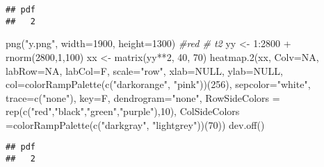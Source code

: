 \documentclass[
]{article}
\newenvironment{Shaded}{\begin{snugshade}}{\end{snugshade}}
\newcommand{\AttributeTok}[1]{\textcolor[rgb]{0.77,0.63,0.00}{#1}}
\newcommand{\CommentTok}[1]{\textcolor[rgb]{0.56,0.35,0.01}{\textit{#1}}}
\newcommand{\ConstantTok}[1]{\textcolor[rgb]{0.00,0.00,0.00}{#1}}
\newcommand{\DecValTok}[1]{\textcolor[rgb]{0.00,0.00,0.81}{#1}}
\newcommand{\FunctionTok}[1]{\textcolor[rgb]{0.00,0.00,0.00}{#1}}
\newcommand{\NormalTok}[1]{#1}
\newcommand{\OtherTok}[1]{\textcolor[rgb]{0.56,0.35,0.01}{#1}}
\newcommand{\SpecialCharTok}[1]{\textcolor[rgb]{0.00,0.00,0.00}{#1}}
\newcommand{\StringTok}[1]{\textcolor[rgb]{0.31,0.60,0.02}{#1}}
\begin{document}
\begin{verbatim}
## pdf 
##   2
\end{verbatim}

\begin{Shaded}
\begin{Highlighting}[]
\FunctionTok{png}\NormalTok{(}\StringTok{"y.png"}\NormalTok{, }\AttributeTok{width=}\DecValTok{1900}\NormalTok{, }\AttributeTok{height=}\DecValTok{1300}\NormalTok{) }\CommentTok{\#red \# t2 }
\NormalTok{yy }\OtherTok{\textless{}{-}} \DecValTok{1}\SpecialCharTok{:}\DecValTok{2800} \SpecialCharTok{+} \FunctionTok{rnorm}\NormalTok{(}\DecValTok{2800}\NormalTok{,}\DecValTok{1}\NormalTok{,}\DecValTok{100}\NormalTok{)}
\NormalTok{xx }\OtherTok{\textless{}{-}} \FunctionTok{matrix}\NormalTok{(yy}\SpecialCharTok{**}\DecValTok{2}\NormalTok{, }\DecValTok{40}\NormalTok{, }\DecValTok{70}\NormalTok{)}
\FunctionTok{heatmap.2}\NormalTok{(xx, }\AttributeTok{Colv=}\ConstantTok{NA}\NormalTok{, }\AttributeTok{labRow=}\ConstantTok{NA}\NormalTok{, }\AttributeTok{labCol=}\NormalTok{F, }\AttributeTok{scale=}\StringTok{"row"}\NormalTok{, }\AttributeTok{xlab=}\ConstantTok{NULL}\NormalTok{,}
          \AttributeTok{ylab=}\ConstantTok{NULL}\NormalTok{, }\AttributeTok{col=}\FunctionTok{colorRampPalette}\NormalTok{(}\FunctionTok{c}\NormalTok{(}\StringTok{"darkorange"}\NormalTok{, }\StringTok{"pink"}\NormalTok{))(}\DecValTok{256}\NormalTok{),  }
        \AttributeTok{sepcolor=}\StringTok{"white"}\NormalTok{, }\AttributeTok{trace=}\FunctionTok{c}\NormalTok{(}\StringTok{"none"}\NormalTok{), }\AttributeTok{key=}\NormalTok{F, }\AttributeTok{dendrogram=}\StringTok{"none"}\NormalTok{,}
        \AttributeTok{RowSideColors =} \FunctionTok{rep}\NormalTok{(}\FunctionTok{c}\NormalTok{(}\StringTok{"red"}\NormalTok{,}\StringTok{"black"}\NormalTok{,}\StringTok{"green"}\NormalTok{,}\StringTok{"purple"}\NormalTok{),}\DecValTok{10}\NormalTok{),}
        \AttributeTok{ColSideColors =}\FunctionTok{colorRampPalette}\NormalTok{(}\FunctionTok{c}\NormalTok{(}\StringTok{"darkgray"}\NormalTok{, }\StringTok{"lightgrey"}\NormalTok{))(}\DecValTok{70}\NormalTok{))}
\FunctionTok{dev.off}\NormalTok{()}
\end{Highlighting}
\end{Shaded}

\begin{verbatim}
## pdf 
##   2
\end{verbatim}
\end{document}
